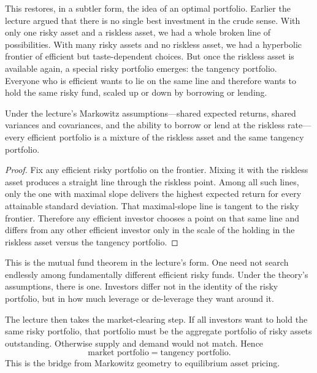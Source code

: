 This restores, in a subtler form, the idea of an optimal portfolio. Earlier the lecture argued that there is no single best investment in the crude sense. With only one risky asset and a riskless asset, we had a whole broken line of possibilities. With many risky assets and no riskless asset, we had a hyperbolic frontier of efficient but taste-dependent choices. But once the riskless asset is available again, a special risky portfolio emerges: the tangency portfolio. Everyone who is efficient wants to lie on the same line and therefore wants to hold the same risky fund, scaled up or down by borrowing or lending.

\begin{proposition}
Under the lecture's Markowitz assumptions---shared expected returns, shared variances and covariances, and the ability to borrow or lend at the riskless rate---every efficient portfolio is a mixture of the riskless asset and the same tangency portfolio.
\end{proposition}

\begin{proof}
Fix any efficient risky portfolio on the frontier. Mixing it with the riskless asset produces a straight line through the riskless point. Among all such lines, only the one with maximal slope delivers the highest expected return for every attainable standard deviation. That maximal-slope line is tangent to the risky frontier. Therefore any efficient investor chooses a point on that same line and differs from any other efficient investor only in the scale of the holding in the riskless asset versus the tangency portfolio.
\end{proof}

This is the mutual fund theorem in the lecture's form. One need not search endlessly among fundamentally different efficient risky funds. Under the theory's assumptions, there is one. Investors differ not in the identity of the risky portfolio, but in how much leverage or de-leverage they want around it.

The lecture then takes the market-clearing step. If all investors want to hold the same risky portfolio, that portfolio must be the aggregate portfolio of risky assets outstanding. Otherwise supply and demand would not match. Hence
\begin{equation}
\text{market portfolio} = \text{tangency portfolio}.
\end{equation}
This is the bridge from Markowitz geometry to equilibrium asset pricing.

